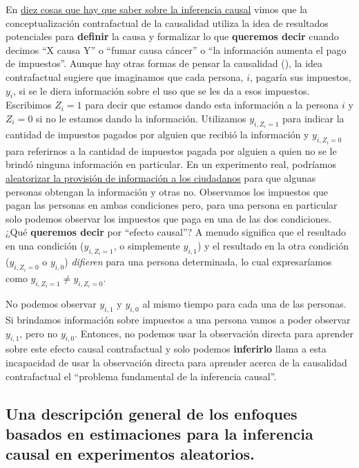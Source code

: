 \documentclass[
]{article}
\begin{document}
En \href{https://egap.org/resource/10-things-to-know-about-causal-inference}{diez cosas que hay que saber sobre la inferencia causal} vimos que la conceptualización contrafactual de la causalidad utiliza la idea de resultados potenciales para \textbf{definir} la causa y formalizar lo que \textbf{queremos decir} cuando decimos ``X causa Y'' o ``fumar causa cáncer'' o ``la información aumenta el pago de impuestos''. Aunque hay otras formas de pensar la causalidad
(\textcite{brady2008causation}), la idea contrafactual sugiere que imaginamos que
cada persona, \(i\), pagaría sus impuestos, \(y_{i}\), si se le diera
información sobre el uso que se les da a esos impuestos. Escribimos \(Z_i = 1\) para decir que estamos dando esta información a la persona \(i\) y \(Z_i = 0\) si no le estamos dando la información. Utilizamos \(y_{i, Z_i = 1}\) para indicar la cantidad de impuestos pagados por alguien que recibió la información y \(y_{i, Z_i = 0}\) para referirnos a la cantidad de impuestos pagada por alguien a quien no se le brindó ninguna información en particular. En un experimento real, podríamos \href{http://egap.org/metaketa/metaketa-ii-taxation}{aleatorizar la provisión de información a los ciudadanos} para que algunas personas obtengan la información y otras
no. Observamos los impuestos que pagan las personas en ambas condiciones pero, para una persona en particular solo podemos observar los impuestos que paga en una de las dos
condiciones. ¿Qué \textbf{queremos decir} por ``efecto causal''? A menudo significa que el resultado en una condición (\(y_ {i, Z_i = 1}\), o simplemente \(y_ {i, 1}\)) y el resultado en la otra condición (\(y_ {i, Z_i = 0}\) o \(y_ {i, 0}\)) \emph{difieren} para una persona determinada, lo cual expresaríamos como \(y_{i, Z_i = 1} \ne y_{i, Z_i = 0}\).

No podemos observar \(y_{i, 1}\) y \(y_{i, 0}\) al mismo tiempo para cada una de las personas. Si brindamos información sobre impuestos a una persona vamos a poder observar \(y_{i, 1}\), pero no \(y_{i, 0}\). Entonces, no podemos usar la observación directa para aprender sobre este efecto causal contrafactual y solo podemos \textbf{inferirlo}
\textcite{holland1986statistics} llama a esta incapacidad de usar la observación directa para
aprender acerca de la causalidad contrafactual el ``problema fundamental de la inferencia causal''.

\hypertarget{una-descripciuxf3n-general-de-los-enfoques-basados-en-estimaciones-para-la-inferencia-causal-en-experimentos-aleatorios.}{%
\subsection{Una descripción general de los enfoques basados en estimaciones para la inferencia causal en experimentos aleatorios.}\label{una-descripciuxf3n-general-de-los-enfoques-basados-en-estimaciones-para-la-inferencia-causal-en-experimentos-aleatorios.}}
\end{document}
